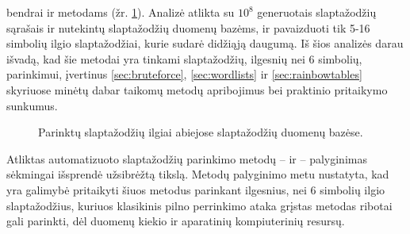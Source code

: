 \documentclass{VUMIFInfBakalaurinis}
\begin{document}
bendrai  ir  metodams (žr. 
\ref{plot:picked-lengths}). Analizė atlikta su $10^8$ generuotais slaptažodžių 
sąrašais  ir  nutekintų slaptažodžių 
duomenų bazėms, ir pavaizduoti tik 5-16 simbolių ilgio slaptažodžiai, kurie 
sudarė didžiąją daugumą. Iš šios analizės darau išvadą, kad šie metodai yra 
tinkami slaptažodžių, ilgesnių nei 6 simbolių, parinkimui, įvertinus 
\ref{sec:bruteforce}, \ref{sec:wordlists} ir \ref{sec:rainbowtables} skyriuose 
minėtų dabar taikomų metodų apribojimus bei praktinio pritaikymo sunkumus.
\begin{figure}[!ht]
  \begin{center}
  \end{center}
  \caption{Parinktų slaptažodžių ilgiai abiejose slaptažodžių duomenų bazėse.}
  \label{plot:picked-lengths}
\end{figure}
Atliktas automatizuoto slaptažodžių parinkimo metodų --  ir 
 -- palyginimas sėkmingai išsprendė užsibrėžtą tikslą. Metodų 
palyginimo metu nustatyta, kad yra galimybė pritaikyti šiuos metodus parinkant 
ilgesnius, nei 6 simbolių ilgio slaptažodžius, kuriuos klasikinis pilno 
perrinkimo ataka grįstas metodas ribotai gali parinkti, dėl duomenų kiekio ir 
aparatinių kompiuterinių resursų.
\end{document}
